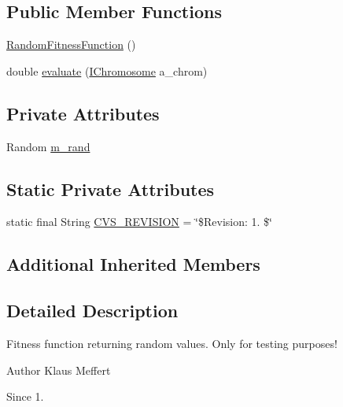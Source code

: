 \subsection*{Public Member Functions}
\begin{DoxyCompactItemize}
\item 
\hyperlink{classorg_1_1jgap_1_1impl_1_1_random_fitness_function_a471c31680b07a2b90a4c23809dcdf344}{Random\-Fitness\-Function} ()
\item 
double \hyperlink{classorg_1_1jgap_1_1impl_1_1_random_fitness_function_a946f5cf586ad067f029a4ab65f45f1f0}{evaluate} (\hyperlink{interfaceorg_1_1jgap_1_1_i_chromosome}{I\-Chromosome} a\-\_\-chrom)
\end{DoxyCompactItemize}
\subsection*{Private Attributes}
\begin{DoxyCompactItemize}
\item 
Random \hyperlink{classorg_1_1jgap_1_1impl_1_1_random_fitness_function_a232532b1d636f067eeb0b53418c8a5a7}{m\-\_\-rand}
\end{DoxyCompactItemize}
\subsection*{Static Private Attributes}
\begin{DoxyCompactItemize}
\item 
static final String \hyperlink{classorg_1_1jgap_1_1impl_1_1_random_fitness_function_a5796f3db10a2e69a728830dec72b1f9a}{C\-V\-S\-\_\-\-R\-E\-V\-I\-S\-I\-O\-N} = \char`\"{}\$Revision\-: 1. \$\char`\"{}
\end{DoxyCompactItemize}
\subsection*{Additional Inherited Members}


\subsection{Detailed Description}
Fitness function returning random values. Only for testing purposes!

\begin{DoxyAuthor}{Author}
Klaus Meffert 
\end{DoxyAuthor}
\begin{DoxySince}{Since}
1. 
\end{DoxySince}


